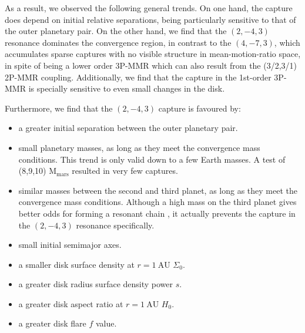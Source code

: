 \documentclass[baaa]{baaa}
\begin{document}
As a result, we observed the following general trends. 
On one hand, the capture does depend on initial relative separations, being particularly sensitive to that of the outer planetary pair.
On the other hand, we find that the $(2,-4,3)$ resonance dominates the convergence region, in contrast to the $(4,-7,3)$, which accumulates sparse captures with no visible structure in mean-motion-ratio space, in spite of being a lower order 3P-MMR which can also result from the (3/2,3/1) 2P-MMR coupling.
Additionally, we find that the capture in the 1st-order 3P-MMR is specially sensitive to even small changes in the disk.


Furthermore, we find that the $(2,-4,3)$ capture is favoured by:

\begin{itemize}
    \item a greater initial separation between the outer planetary pair.
    
    \item small planetary masses, as long as they meet the convergence mass conditions. 
    This trend is only valid down to a few Earth masses. A test of (8,9,10) $\mathrm{M_{mars}}$ resulted in very few captures.
    
    \item similar masses between the second and third planet, as long as they meet the convergence mass conditions.
    Although a high mass on the third planet gives better odds for forming a resonant chain \citep{beauge.cerioni.2022}, it actually prevents the capture in the $(2,-4,3)$ resonance specifically. 
    
    \item small initial semimajor axes.

    \item a smaller disk surface density at $r=1~\mathrm{AU}$ $\Sigma_0$.

    \item a greater disk radius surface density power $s$.
    
    \item a greater disk aspect ratio at $r=1~\mathrm{AU}$ $H_0$.
    
    \item a greater disk flare $f$ value.
\end{itemize}
\end{document}
